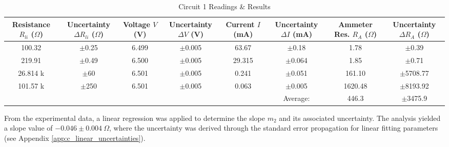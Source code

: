 \documentclass{article} %
\begin{document}
\begin{table}[htbp]
\centering
\caption{Circuit 1 Readings \& Results}
\begin{tabular}{|c|c|c|c|c|c|c|c|}
\hline
\makecell{Resistance \\ $R_{li}$ ($\Omega$)} & \makecell{Uncertainty \\ $\Delta R_{li}$ ($\Omega$)} & \makecell{Voltage \\ $V$ (V)} & \makecell{Uncertainty \\ $\Delta V$ (V)} & \makecell{Current \\ $I$ (mA)} & \makecell{Uncertainty \\ $\Delta I$ (mA)} & \makecell{Ammeter Res. \\ $R_A$ ($\Omega$)} & \makecell{Uncertainty \\ $\Delta R_A$ ($\Omega$)} \\
\hline
100.32 & $\pm$0.25 & 6.499 & $\pm$0.005 & 63.67 & $\pm$0.18 & 1.78 & $\pm$0.39 \\
\hline
219.91 & $\pm$0.49 & 6.500 & $\pm$0.005 & 29.315 & $\pm$0.064 & 1.85 & $\pm$0.71 \\
\hline
26.814 k & $\pm$60 & 6.501 & $\pm$0.005 & 0.241 & $\pm$0.051 & 161.10 & $\pm$5708.77 \\
\hline
101.57 k & $\pm$250 & 6.501 & $\pm$0.005 & 0.063 & $\pm$0.005 & 1620.48 & $\pm$8193.92 \\
\hline
\cellcolor{gray!50} & \cellcolor{gray!50} & \cellcolor{gray!50} & \cellcolor{gray!50} & \cellcolor{gray!50} & Average: & 446.3 & $\pm$3475.9 \\
\hline
\end{tabular}
\end{table}

From the experimental data, a linear regression was applied to determine the slope $m_2$ and its associated uncertainty. 
The analysis yielded a slope value of $-0.046 \pm 0.004~\Omega$, where the uncertainty was derived through the standard error propagation for linear fitting parameters (see Appendix \ref{app:c_linear_uncertainties}).
\end{document}
